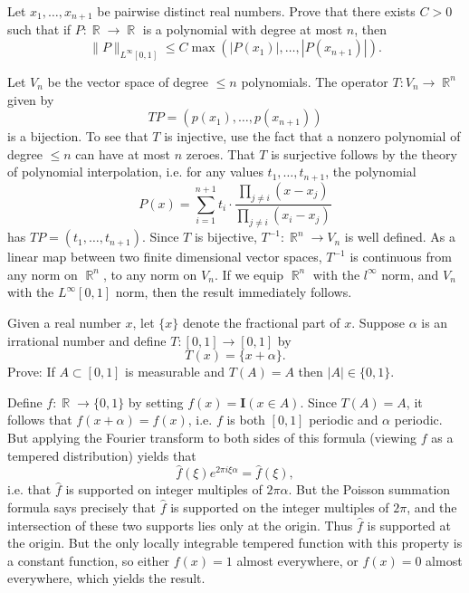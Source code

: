 \documentclass[answers]{exam}
\DeclareMathOperator{\RR}{\mathbb{R}}
\theoremstyle{problemstyle}
\newcommand{\1}[1]{\textbf{1}_{\left[#1\right]}} %
\begin{document}
\begin{questions}
\question Let $x_1,\dots,x_{n+1}$ be pairwise distinct real numbers. Prove that there exists $C > 0$ such that if $P: \RR \to \RR$ is a polynomial with degree at most $n$, then
%
\[ \| P \|_{L^\infty[0,1]}\leq C \max \left( |P(x_1)|, \dots, |P(x_{n+1})| \right). \]
\begin{solution}
	Let $V_n$ be the vector space of degree $\leq n$ polynomials. The operator $T: V_n \to \RR^n$ given by
	\[ TP = ( p(x_1), \dots, p(x_{n+1}) ) \]
	is a bijection. To see that $T$ is injective, use the fact that a nonzero polynomial of degree $\leq n$ can have at most $n$ zeroes. That $T$ is surjective follows by the theory of polynomial interpolation, i.e. for any values $t_1,\dots,t_{n+1}$, the polynomial
	\[ P(x) = \sum_{i = 1}^{n+1} t_i \cdot \frac{\prod_{j \neq i} (x - x_j)}{\prod_{j \neq i} (x_i - x_j)} \]
	has $TP = (t_1,\dots,t_{n+1})$. Since $T$ is bijective, $T^{-1}: \RR^n \to V_n$ is well defined. As a linear map between two finite dimensional vector spaces, $T^{-1}$ is continuous from any norm on $\RR^n$, to any norm on $V_n$. If we equip $\RR^n$ with the $l^\infty$ norm, and $V_n$ with the $L^\infty[0,1]$ norm, then the result immediately follows.
\end{solution}

\question Given a real number $x$, let $\{ x \}$ denote the fractional part of $x$. Suppose $\alpha$ is an irrational number and define $T: [0,1] \to [0,1]$ by
%
\[ T(x) = \{ x + \alpha \}. \]
%
Prove: If $A \subset [0,1]$ is measurable and $T(A) = A$ then $|A| \in \{ 0, 1 \}$.
\begin{solution}
	Define $f: \RR \to \{ 0, 1 \}$ by setting $f(x) = \mathbf{I}(x \in A)$. Since $T(A) = A$, it follows that $f(x + \alpha) = f(x)$, i.e. $f$ is both $[0,1]$ periodic and $\alpha$ periodic. But applying the Fourier transform to both sides of this formula (viewing $f$ as a tempered distribution) yields that
	\[ \widehat{f}(\xi) e^{2 \pi i \xi \alpha} = \widehat{f}(\xi), \]
	i.e. that $\widehat{f}$ is supported on integer multiples of $2 \pi \alpha$. But the Poisson summation formula says precisely that $\widehat{f}$ is supported on the integer multiples of $2 \pi$, and the intersection of these two supports lies only at the origin. Thus $\widehat{f}$ is supported at the origin. But the only locally integrable tempered function with this property is a constant function, so either $f(x) = 1$ almost everywhere, or $f(x) = 0$ almost everywhere, which yields the result.


\end{solution}
\end{questions}
\end{document}
